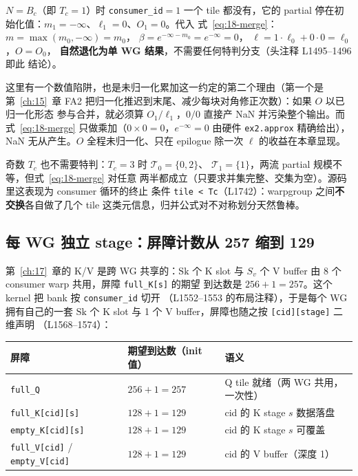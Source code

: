 $N = B_c$（即 $T_c = 1$）时 \texttt{consumer\_id}$=1$ 一个 tile 都没有，它的
partial 停在初始化值：$m_1 = -\infty$、$\ell_1 = 0$、$O_1 = 0$。代入
式~\ref{eq:18-merge}：$m = \max(m_0, -\infty) = m_0$，
$\beta = e^{-\infty - m_0} = e^{-\infty} = 0$，
$\ell = 1 \cdot \ell_0 + 0 \cdot 0 = \ell_0$，$O = O_0$，
\textbf{自然退化为单 WG 结果}，不需要任何特判分支（头注释 L1495--1496 即此
结论）。

这里有一个数值陷阱，也是未归一化累加这一约定的第二个理由（第一个是
第~\ref{ch:15}~章 FA2 把归一化推迟到末尾、减少每块对角修正次数）：如果 $O$ 以已归一化形态
参与合并，就必须算 $O_1/\ell_1$，$0/0$ 直接产 NaN 并污染整个输出。而
式~\ref{eq:18-merge} 只做乘加（$0 \times 0 = 0$，$e^{-\infty} = 0$ 由硬件
\texttt{ex2.approx} 精确给出），NaN 无从产生。$O$ 全程未归一化、只在
epilogue 除一次 $\ell$ 的收益在本章显现。

奇数 $T_c$ 也不需要特判：$T_c = 3$ 时 $\mathcal{T}_0 = \{0,2\}$、
$\mathcal{T}_1 = \{1\}$，两流 partial 规模不等，但式~\ref{eq:18-merge} 对任意
两半都成立（只要求并集完整、交集为空）。源码里这表现为 consumer 循环的终止
条件 \texttt{tile < Tc}（L1742）：warpgroup 之间\textbf{不交换}各自做了几个
tile 这类元信息，归并公式对不对称划分天然鲁棒。

\subsection{每 WG 独立 stage：屏障计数从 257 缩到 129}

第~\ref{ch:17}~章的 K/V 是跨 WG 共享的：$\mathrm{Sk}$ 个 K slot 与
$S_v$ 个 V buffer 由 8 个 consumer warp 共用，屏障 \texttt{full\_K[s]} 的期望
到达数是 $256 + 1 = 257$。这个 kernel 把 bank 按 \texttt{consumer\_id} 切开
（L1552--1553 的布局注释），于是每个 WG 拥有自己的一套 $\mathrm{Sk}$
个 K slot 与 1 个 V buffer，屏障也随之按 \texttt{[cid][stage]} 二维声明
（L1568--1574）：

\begin{center}
\begin{tabular}{lll}
\toprule
屏障 & 期望到达数（init 值） & 语义 \\
\midrule
\texttt{full\_Q} & $256 + 1 = 257$ & Q tile 就绪（两 WG 共用，一次性） \\
\texttt{full\_\allowbreak{}K[cid][s]} & $128 + 1 = 129$ & cid 的 K stage $s$ 数据落盘 \\
\texttt{empty\_\allowbreak{}K[cid][s]} & $128 + 1 = 129$ & cid 的 K stage $s$ 可覆盖 \\
\texttt{full\_V[cid]} / \texttt{empty\_\allowbreak{}V[cid]} & $128 + 1 = 129$ & cid 的 V buffer（深度 1）\\
\bottomrule
\end{tabular}
\end{center}

